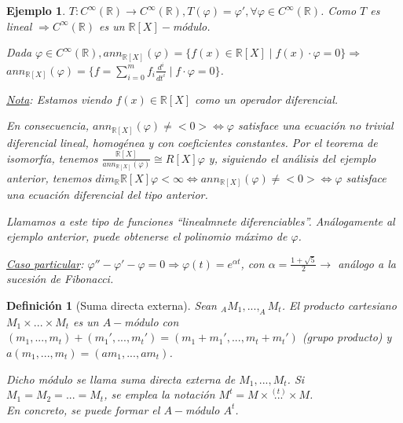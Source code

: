 \documentclass[11pt,a4paper]{article}
\theoremstyle{break}
\newtheorem{example}[theorem]{Ejemplo}
\newtheorem{definition}[theorem]{Definición}
\begin{document}
\begin{example}
$T: C^{\infty}(\mathbb{R}) \to C^{\infty}(\mathbb{R}), T(\varphi) = \varphi', \forall \varphi \in C^{\infty}(\mathbb{R})$. Como $T$ es lineal $\Rightarrow C^{\infty}(\mathbb{R})$ es un $\mathbb{R}[X]-$módulo.

Dada $\varphi \in C^{\infty}(\mathbb{R}), ann_{\mathbb{R}[X]}(\varphi) = \{f(x) \in \mathbb{R}[X] \mid f(x) \cdot \varphi = 0\} \Rightarrow$ \\ $ann_{\mathbb{R}[X]}(\varphi) = \{f = \sum_{i=0}^{m} f_{i} \frac{d^{i}}{dt^{i}} \mid f \cdot \varphi = 0\}$.

\underline{Nota}: Estamos viendo $f(x) \in \mathbb{R}[X]$ como un operador diferencial.

En consecuencia, $ann_{\mathbb{R}[X]}(\varphi) \neq <0> \iff \varphi$ satisface una ecuación no trivial diferencial lineal, homogénea y con coeficientes constantes. Por el teorema de isomorfía, tenemos $\frac{\mathbb{R}[X]}{ann_{\mathbb{R}[X]}(\varphi)} \cong R[X]\varphi$ y, siguiendo el análisis del ejemplo anterior, tenemos $dim_{\mathbb{R}} \mathbb{R}[X]\varphi < \infty \iff ann_{\mathbb{R}[X]}(\varphi) \neq <0> \iff \varphi$ satisface una ecuación diferencial del tipo anterior.

Llamamos a este tipo de funciones ``linealmnete diferenciables''. Análogamente al ejemplo anterior, puede obtenerse el polinomio máximo de $\varphi$.

\underline{Caso particular}: $\varphi'' - \varphi' - \varphi = 0 \Rightarrow \varphi(t) = e^{\alpha t}$, con $\alpha = \frac{1 + \sqrt{5}}{2} \rightarrow$ análogo a la sucesión de Fibonacci.
\end{example}

\begin{definition}[Suma directa externa]
Sean $_{A}M_{1}, ..., _{A}M_{t}$. El producto cartesiano $M_{1} \times ... \times M_{t}$ es un $A-$módulo con $(m_{1}, ..., m_{t}) + (m_{1}', ..., m_{t}') = (m_{1} + m_{1}', ..., m_{t} + m_{t}')$ (grupo producto) y $a(m_{1}, ..., m_{t}) = (am_{1}, ..., am_{t})$.

Dicho módulo se llama suma directa externa de $M_{1}, ..., M_{t}$. Si $M_{1} = M_{2} = ... = M_{t}$, se emplea la notación $M^{t} = M \times \overset{(t)}{...} \times M$. \\
En concreto, se puede formar el $A-$módulo $A^{t}$.
\end{definition}
\end{document}
